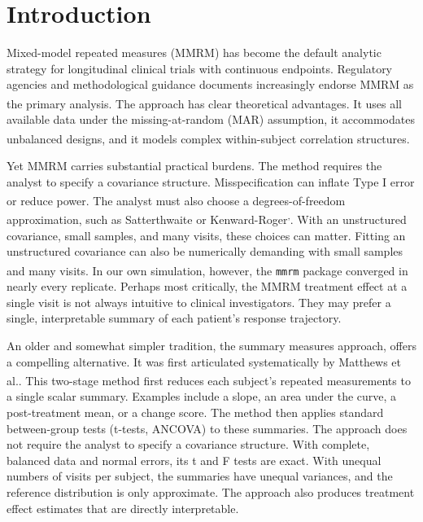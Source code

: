 \documentclass[
  11pt,
]{article}
\begin{document}
\section{Introduction}\label{introduction}

Mixed-model repeated measures (MMRM) has become the default
analytic strategy for longitudinal clinical trials with
continuous endpoints. Regulatory agencies and methodological
guidance documents increasingly endorse MMRM as the primary
analysis\textsuperscript{}. The approach has clear theoretical
advantages. It uses all available data under the
missing-at-random (MAR) assumption, it accommodates unbalanced
designs, and it models complex within-subject correlation
structures\textsuperscript{}.

Yet MMRM carries substantial practical burdens. The method
requires the analyst to specify a covariance structure.
Misspecification can inflate Type I error or reduce power\textsuperscript{}. The analyst must also
choose a degrees-of-freedom approximation, such as
Satterthwaite or Kenward-Roger\textsuperscript{,}. With an unstructured
covariance, small samples, and many visits, these choices can
matter. Fitting an unstructured covariance can also be
numerically demanding with small samples and many visits. In
our own simulation, however, the \texttt{mmrm} package\textsuperscript{} converged in nearly every replicate.
Perhaps most critically, the MMRM treatment effect at a single
visit is not always intuitive to clinical investigators. They
may prefer a single, interpretable summary of each patient's
response trajectory.

An older and somewhat simpler tradition, the summary measures
approach, offers a compelling alternative. It was first
articulated systematically by
Matthews et al.\textsuperscript{}. This
two-stage method first reduces each subject's repeated measurements to a
single scalar summary. Examples include a slope, an area under the
curve, a post-treatment mean, or a change score. The method then applies
standard between-group tests (t-tests, ANCOVA) to these summaries. The
approach does not require the analyst to specify a covariance structure.
With complete, balanced data and normal errors, its t and F tests are
exact. With unequal numbers of visits per subject, the summaries have
unequal variances, and the reference distribution is only approximate.
The approach also produces treatment effect estimates that are directly
interpretable.
\end{document}
